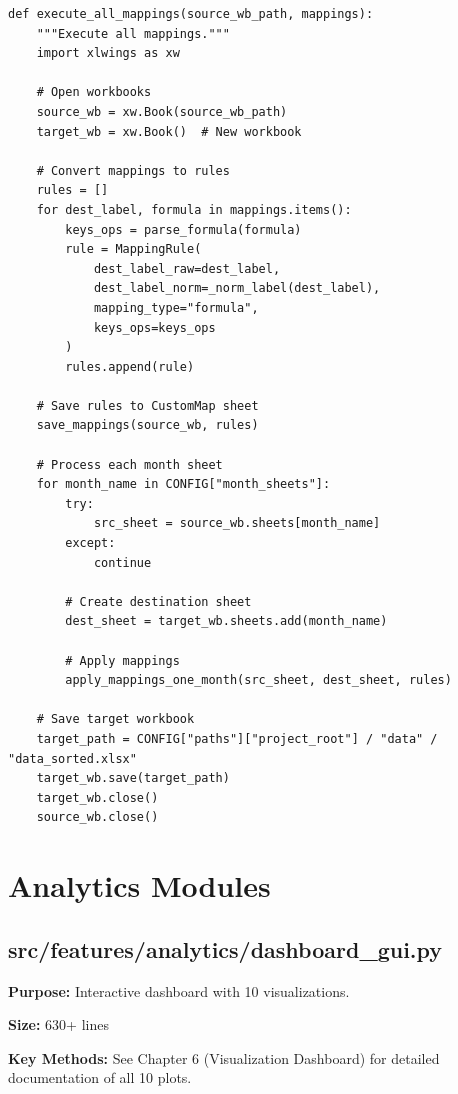\begin{lstlisting}[style=pythonstyle]
def execute_all_mappings(source_wb_path, mappings):
    """Execute all mappings."""
    import xlwings as xw
    
    # Open workbooks
    source_wb = xw.Book(source_wb_path)
    target_wb = xw.Book()  # New workbook
    
    # Convert mappings to rules
    rules = []
    for dest_label, formula in mappings.items():
        keys_ops = parse_formula(formula)
        rule = MappingRule(
            dest_label_raw=dest_label,
            dest_label_norm=_norm_label(dest_label),
            mapping_type="formula",
            keys_ops=keys_ops
        )
        rules.append(rule)
    
    # Save rules to CustomMap sheet
    save_mappings(source_wb, rules)
    
    # Process each month sheet
    for month_name in CONFIG["month_sheets"]:
        try:
            src_sheet = source_wb.sheets[month_name]
        except:
            continue
        
        # Create destination sheet
        dest_sheet = target_wb.sheets.add(month_name)
        
        # Apply mappings
        apply_mappings_one_month(src_sheet, dest_sheet, rules)
    
    # Save target workbook
    target_path = CONFIG["paths"]["project_root"] / "data" / "data_sorted.xlsx"
    target_wb.save(target_path)
    target_wb.close()
    source_wb.close()
\end{lstlisting}

\section{Analytics Modules}

\subsection{src/features/analytics/dashboard\_gui.py}

\textbf{Purpose:} Interactive dashboard with 10 visualizations.

\textbf{Size:} 630+ lines

\textbf{Key Methods:} See Chapter 6 (Visualization Dashboard) for detailed documentation of all 10 plots.

